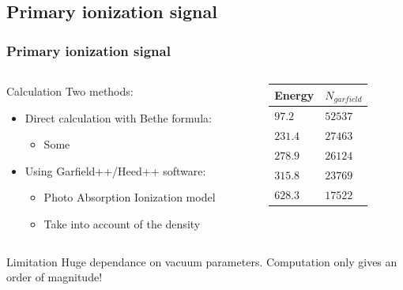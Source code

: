 \subsection{Primary ionization signal}
\begin{frame}
  \frametitle{Primary ionization signal}
  \begin{columns}
    \begin{column}{0.55\textwidth}
      \begin{block}{Calculation}
        Two methods:
        \begin{itemize}
          \item Direct calculation with Bethe formula:
          \begin{itemize}
            \item Some
          \end{itemize}
          \item Using Garfield++/Heed++ software:
          \begin{itemize}
            \item Photo Absorption Ionization model
            \item Take into account of the density
          \end{itemize}
        \end{itemize}
      \end{block}
    \end{column}
    \begin{column}{0.35\textwidth}
      \begin{tabularx}{\linewidth}{XX}
        \toprule
        Energy    & \(N_{garfield}\) \\
        \midrule
        \(97.2\)  & \(52537\)        \\
        \(231.4\) & \(27463\)        \\
        \(278.9\) & \(26124\)        \\
        \(315.8\) & \(23769\)        \\
        \(628.3\) & \(17522\)        \\
        \bottomrule
      \end{tabularx}
    \end{column}
  \end{columns}
  \begin{alertblock}{Limitation}
    Huge dependance on vacuum parameters. Computation only gives an order of magnitude!
  \end{alertblock}
\end{frame}

